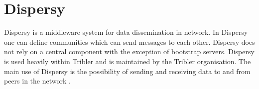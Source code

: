 
\section{Dispersy}
Dispersy is a middleware system for data dissemination in  network.
In Dispersy one can define communities which can send messages to each other.
Dispersy does not rely on a central component with the exception of bootstrap servers.
Dispersy is used heavily within Tribler and is maintained by the Tribler organisation.
The main use of Dispersy is the possibility of sending and receiving data to and from peers in the network \cite{zeilemaker-dispersy}. 